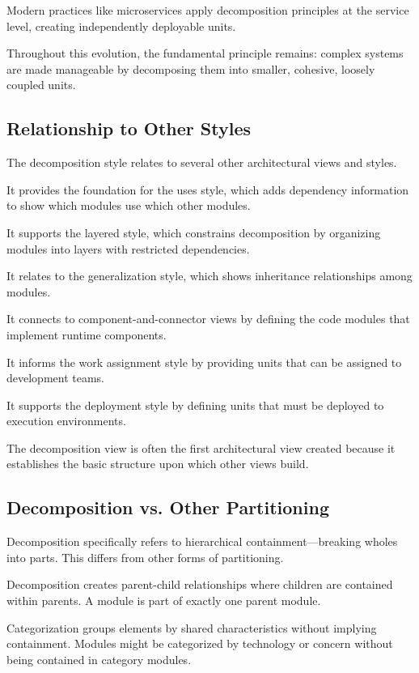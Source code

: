 \documentclass[11pt]{article}
\begin{document}
Modern practices like microservices apply decomposition principles at the service level, creating independently deployable units.

Throughout this evolution, the fundamental principle remains: complex systems are made manageable by decomposing them into smaller, cohesive, loosely coupled units.

\subsection{Relationship to Other Styles}

The decomposition style relates to several other architectural views and styles.

It provides the foundation for the uses style, which adds dependency information to show which modules use which other modules.

It supports the layered style, which constrains decomposition by organizing modules into layers with restricted dependencies.

It relates to the generalization style, which shows inheritance relationships among modules.

It connects to component-and-connector views by defining the code modules that implement runtime components.

It informs the work assignment style by providing units that can be assigned to development teams.

It supports the deployment style by defining units that must be deployed to execution environments.

The decomposition view is often the first architectural view created because it establishes the basic structure upon which other views build.

\subsection{Decomposition vs. Other Partitioning}

Decomposition specifically refers to hierarchical containment---breaking wholes into parts. This differs from other forms of partitioning.

Decomposition creates parent-child relationships where children are contained within parents. A module is part of exactly one parent module.

Categorization groups elements by shared characteristics without implying containment. Modules might be categorized by technology or concern without being contained in category modules.
\end{document}
